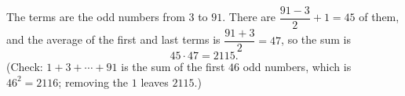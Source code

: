 The terms are the odd numbers from $3$ to $91$. There are $\dfrac{91-3}{2}+1=45$ of them, and the average of the first and last terms is $\dfrac{91+3}{2}=47$, so the sum is
\[45\cdot47=\boxed{2115}.\]
(Check: $1+3+\cdots+91$ is the sum of the first $46$ odd numbers, which is $46^2=2116$; removing the $1$ leaves $2115$.)

